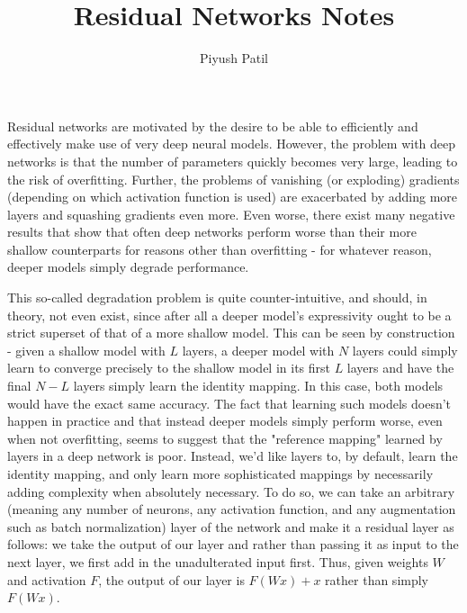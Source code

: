 \documentclass{article}
\begin{document}
\title{Residual Networks Notes}
\author{Piyush Patil}
\maketitle

Residual networks are motivated by the desire to be able to efficiently and effectively make use of very deep neural models. However, the problem with deep networks is that the number of parameters quickly becomes very large, leading to the risk of overfitting. Further, the problems of vanishing (or exploding) gradients (depending on which activation function is used) are exacerbated by adding more layers and squashing gradients even more. Even worse, there exist many negative results that show that often deep networks perform worse than their more shallow counterparts for reasons other than overfitting - for whatever reason, deeper models simply degrade performance.

This so-called degradation problem is quite counter-intuitive, and should, in theory, not even exist, since after all a deeper model's expressivity ought to be a strict superset of that of a more shallow model. This can be seen by construction - given a shallow model with $ L $ layers, a deeper model with $ N $ layers could simply learn to converge precisely to the shallow model in its first $ L $ layers and have the final $ N - L $ layers simply learn the identity mapping. In this case, both models would have the exact same accuracy. The fact that learning such models doesn't happen in practice and that instead deeper models simply perform worse, even when not overfitting, seems to suggest that the "reference mapping" learned by layers in a deep network is poor. Instead, we'd like layers to, by default, learn the identity mapping, and only learn more sophisticated mappings by necessarily adding complexity when absolutely necessary. To do so, we can take an arbitrary (meaning any number of neurons, any activation function, and any augmentation such as batch normalization) layer of the network and make it a residual layer as follows: we take the output of our layer and rather than passing it as input to the next layer, we first add in the unadulterated input first. Thus, given weights $ W $ and activation $ F $, the output of our layer is $ F(W x) + x $ rather than simply $ F(W x) $.
\end{document}
